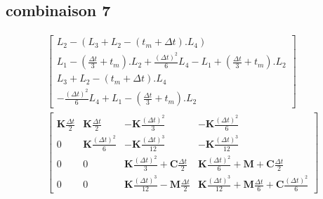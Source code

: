 \documentclass[12pt,a4paper]{report}
\begin{document}
\subsection{combinaison 7}
\begin{equation}
\begin{array}{c}
	\begin{bmatrix}	
		  L_2 - (L_3 + L_2 - (t_m+\Delta t).L_4)
		\\L_1 - \left( \frac{\Delta t}{3} + t_m \right).L_2
			+\frac{(\Delta t)^2}{6} L_4 
			- L_1 
			+ \left( \frac{\Delta t}{3} + t_m \right).L_2
		\\ L_3 + L_2 - (t_m+\Delta t).L_4
		\\ -\frac{(\Delta t)^2}{6} L_4 
			+ L_1 
			- \left( \frac{\Delta t}{3} + t_m \right).L_2
	\end{bmatrix}
	\\
		\begin{bmatrix}   
		   		\mathbf{K} \frac{\Delta t}{2}
			&
		   		\mathbf{K} \frac{\Delta t}{2} 
		   	&
			   	-\mathbf{K} \frac{(\Delta t)^2}{3} 
		   	&
		   		-\mathbf{K} \frac{(\Delta t)^2}{6} 
		\\ 	     
			   0 
			&
				\mathbf{K} \frac{(\Delta t)^2}{6}
		   	&
		   		-\mathbf{K} \frac{(\Delta t)^3}{12}
		   	&
		   		-\mathbf{K} \frac{(\Delta t)^3}{12}
		\\   
		   		0
		   	& 
		   		0
		   	&
			   	\mathbf{K}
			   		\frac{(\Delta t)^2}{3} 
		   		+\mathbf{C} \frac{\Delta t}{2}
		   	&
		   		\mathbf{K} \frac{(\Delta t)^2}{6} 
		   		+\mathbf{M} 
			   	+\mathbf{C} \frac{\Delta t}{2}
		\\    
		   		0
		   	&
		   		0
		   	&
		   		\mathbf{K} \frac{(\Delta t)^3}{12}
		   		-\mathbf{M}
			   		\frac{\Delta t}{2} 
		   	&
		   		\mathbf{K} \frac{(\Delta t)^3}{12}
		   		+\mathbf{M} \frac{\Delta t}{6} 
			   +\mathbf{C} \frac{(\Delta t)^2}{6} 
	\end{bmatrix}
\end{array}
\end{equation}
\end{document}
